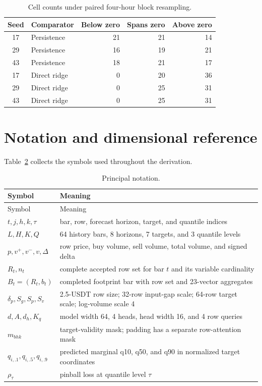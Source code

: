 \documentclass[10pt]{article}
\begin{document}
\begin{table}[H]
\centering
\small
\caption{Cell counts under paired four-hour block resampling.}
\label{tab:resampling}
\begin{tabular}{@{}clrrr@{}}
\toprule
Seed & Comparator & Below zero & Spans zero & Above zero \\
\midrule
17 & Persistence & 21 & 21 & 14 \\
29 & Persistence & 16 & 19 & 21 \\
43 & Persistence & 18 & 21 & 17 \\
17 & Direct ridge & 0 & 20 & 36 \\
29 & Direct ridge & 0 & 25 & 31 \\
43 & Direct ridge & 0 & 25 & 31 \\
\bottomrule
\end{tabular}
\end{table}

\section{Notation and dimensional reference}

Table~\ref{tab:notation} collects the symbols used throughout the derivation.

\begin{longtable}{@{}p{}p{}@{}}
\caption{Principal notation.}\label{tab:notation}\\
\toprule
Symbol & Meaning \\
\midrule
\endfirsthead
\toprule
Symbol & Meaning \\
\midrule
\endhead
$t,j,h,k,\tau$ & bar, row, forecast horizon, target, and quantile indices \\
$L,H,K,Q$ & 64 history bars, 8 horizons, 7 targets, and 3 quantile levels \\
$p,v^+,v^-,v,\Delta$ & row price, buy volume, sell volume, total volume, and signed delta \\
$R_t,n_t$ & complete accepted row set for bar $t$ and its variable cardinality \\
$B_t=(R_t,b_t)$ & completed footprint bar with row set and 23-vector aggregates \\
$\delta_p,S_g,S_p,S_v$ & 2.5-USDT row size; 32-row input-gap scale; 64-row target scale; log-volume scale 4 \\
$d,A,d_h,K_q$ & model width 64, 4 heads, head width 16, and 4 row queries \\
$m_{bhk}$ & target-validity mask; padding has a separate row-attention mask \\
$q_{i,.1},q_{i,.5},q_{i,.9}$ & predicted marginal q10, q50, and q90 in normalized target coordinates \\
$\rho_\tau$ & pinball loss at quantile level $\tau$ \\
\bottomrule
\end{longtable}



\end{document}

